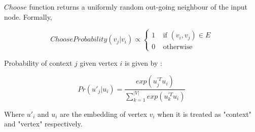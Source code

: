 $Choose$ function returns a uniformly random out-going neighbour of the input node. Formally,

\begin{equation}
    ChooseProbability(v_j | v_i) \propto \left\{
        \begin{array}{ll}
            1 \;\;\;\; \text{if $(v_i, v_j) \in E$}\\
            0 \;\;\;\; \text{otherwise}
        \end{array}
    \right.
\end{equation}

Probability of context $j$ given vertex $i$ is given by \cite{mikolov2013distributed}:

\begin{equation}
    Pr(u'_j|u_i) = \frac{exp(u_j^{'T} u_i)}{\sum_{k=1}^{|V|} exp(u_k^{'T} u_i)}
\end{equation}

Where $u'_i$ and $u_i$ are the embedding of vertex $v_i$ when it is treated as "context" and "vertex" respectively.
